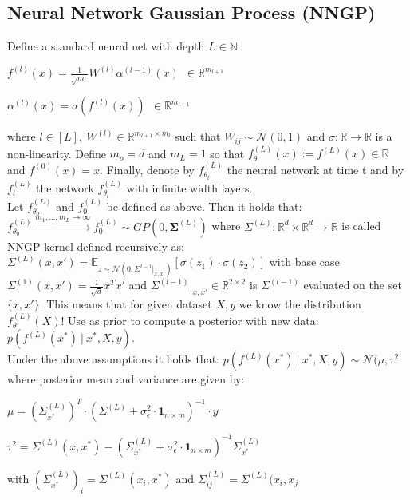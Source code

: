 \subsection*{Neural Network Gaussian Process (NNGP)} Define a standard neural net with depth $L \in \mathbb{N}$:\\
\begin{inparaitem}[$\color{mygreen} \triangleright$]
    \item $f^{(l)}(x) = \frac{1}{\sqrt{m_l}} W^{(l)} \alpha^{(l-1)}(x)\ \ \in \mathbb{R}^{m_{l+1}}$\\
    \item $\alpha^{(l)}(x) = \sigma(f^{(l)}(x))\ \ \in \mathbb{R}^{m_{l+1}}$
\end{inparaitem}
where $l \in [L],\ W^{(l)} \in \mathbb{R}^{m_{l+1} \times m_l}$ such that $W_{ij} \sim \mathcal{N}(0,1)$ and $\sigma: \mathbb{R} \rightarrow \mathbb{R}$ is a non-linearity. Define $m_o = d$ and $m_L = 1$ so that $f_\theta^{(L)}(x) := f^{(L)}(x) \in \mathbb{R}$ and $f^{(0)}(x) = x$. Finally, denote by $f_{\theta_t}^{(L)}$ the neural network at time t and by $f_t^{(L)}$ the network $f_{\theta_t}^{(L)}$ with infinite width layers.\\
 Let $f_{\theta_0}^{(L)}$ and $f_0^{(L)}$ be defined as above. Then it holds that: $f_{\theta_0}^{(L)} \xrightarrow{m_1, ..., m_L \rightarrow \infty}f_0^{(L)} \sim GP(0, \mathbf{\Sigma}^{(L)})$ where $\Sigma^{(L)}: \mathbb{R}^d \times \mathbb{R}^d \rightarrow \mathbb{R}$ is called NNGP kernel defined recursively as:\\
$\Sigma^{(L)}(x, x') = \mathbb{E}_{z \sim \mathcal{N}(0, \Sigma^{l-1}|_{x,x'})}\left[\sigma(z_1) \cdot \sigma(z_2)\right]$ with base case $\Sigma^{(1)}(x,x') = \frac{1}{\sqrt{d}} x^T x'$ and $\Sigma^{(l-1)}|_{x,x'} \in \mathbb{R}^{2 \times 2}$ is $\Sigma^{(l-1)}$ evaluated on the set $\{x,x'\}$. This means that for given dataset $X,y$ we know the distribution $f_\theta^{(L)}(X)$! Use as prior to compute a posterior with new data: $p\left(f^{(L)}(x^*)\ |\ x^*, X, y\right)$.\\
 Under the above assumptions it holds that:
$p\left(f^{(L)}(x^*)\ |\ x^*, X, y\right) \sim \mathcal{N}(\mu, \tau^2$ where posterior mean and variance are given by:\\
\begin{inparaitem}[$\color{mygreen} \triangleright$]
    \item $\mu = (\Sigma_{x^*}^{(L)})^T \cdot (\Sigma^{(L)} + \sigma_{\epsilon}^2 \cdot \mathbf{1}_{n \times m})^{-1} \cdot y$\\
    \item $\tau^2 = \Sigma^{(L)}(x,x^*) - (\Sigma_{x^*}^{(L)} + \sigma_{\epsilon}^2 \cdot \mathbf{1}_{n \times m})^{-1} \Sigma_{x^*}^{(L)}$\\
\end{inparaitem}
with $(\Sigma_{x^*}^{(L)})_i = \Sigma^{(L)}(x_i, x^*)$ and $\Sigma_{ij}^{(L)} = \Sigma^{(L)}(x_i, x_j$